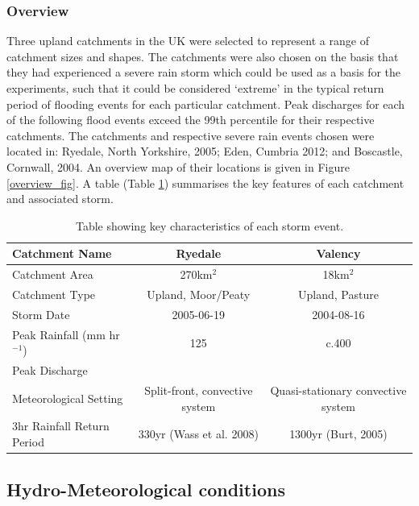 \subsubsection{Overview}
Three upland catchments in the UK were selected to represent a range of catchment sizes and shapes. The catchments were also chosen on the basis that they had experienced a severe rain storm which could be used as a basis for the experiments, such that it could be considered `extreme' in the typical return period of flooding events for each particular catchment. Peak discharges for each of the following flood events exceed the 99th percentile for their respective catchments. The catchments and respective severe rain events chosen were located in: Ryedale, North Yorkshire, 2005; Eden, Cumbria 2012; and Boscastle, Cornwall, 2004. An overview map of their locations is given in Figure \ref{overview_fig}. A table (Table \ref{met_setting}) summarises the key features of each catchment and associated storm.

\linespread{1.5}
\begin{table}
\resizebox{\textwidth}{!}
{%
\begin{tabular}{l c c} \hline

Catchment Name 			& \textbf{Ryedale} &  \textbf{Valency} \\ \hline
Catchment Area   			& 270km$^2$ 				& 18km$^2$ \\ 
Catchment Type         & Upland, Moor/Peaty & Upland, Pasture \\ 
Storm Date	 		            & 2005-06-19 	& 2004-08-16 \\ 
Peak Rainfall	 (mm hr \(^{-1}\))  & 125  & c.400 \\
Peak Discharge	 	 & & \\ 
Meteorological Setting	 	& Split-front, convective system & Quasi-stationary convective system \\ 
3hr Rainfall Return Period 	 & 330yr (Wass et al. 2008)	& 1300yr (Burt, 2005) \\ \hline
\end{tabular}
}
\caption{Table showing key characteristics of each storm event.}
\label{met_setting}
\end{table}

\subsection{Hydro-Meteorological conditions}

